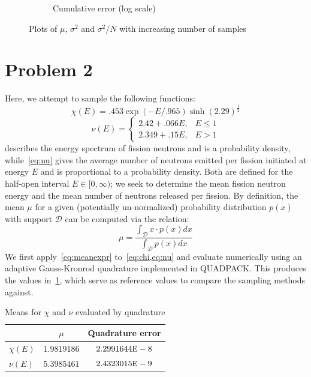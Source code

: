 \documentclass[12pt]{article}
\newcommand{\e}{\ensuremath{ \mbox{\small{E}} }}
\begin{document}
\begin{figure}[H]
\begin{subfigure}[b]{.49\textwidth}
        \caption{Cumulative error (log scale)}
        \label{fig:1:err}
    \end{subfigure}
    \caption{Plots of $\mu$, $\sigma^2$ and $\sigma^2 / N$ with increasing number of samples}
    \label{fig:1}
\end{figure}

\section*{Problem 2}

Here, we attempt to sample the following functions:
\begin{equation}
    \chi(E) = .453\exp(-E/.965)\sinh(2.29)^\frac{1}{2}
    \label{eq:chi}
\end{equation}
\begin{equation}
    \nu(E) = 
    \begin{cases}
        2.42 + .066E, & E\leq 1 \\
        2.349 + .15E, & E > 1
    \end{cases}
    \label{eq:nu}
\end{equation}
 describes the energy spectrum of fission neutrons and is a probability density, while~\cref{eq:nu}
gives the average number of neutrons emitted per fission initiated at energy $E$ and is proportional to a probability
density. Both are defined for the half-open interval $E\in [0,\infty)$; we seek to determine the mean fission
neutron energy and the mean number of neutrons released per fission. By definition, the mean $\mu$ for a given (potentially
un-normalized) probability distribution $p(x)$ with support $\mathcal{D}$ can be computed via the relation:
\begin{equation}
    \mu = \frac{\int_\mathcal{D} x \cdot p(x) dx}{\int_\mathcal{D} p(x) dx}
    \label{eq:meanexpr}
\end{equation}
We first apply~\cref{eq:meanexpr} to~\cref{eq:chi,eq:nu} and evaluate numerically using an adaptive Gauss-Kronrod
quadrature implemented in QUADPACK. This produces the values in~\cref{tab:quad}, which serve as reference values to compare
the sampling methods against.
\begin{table}[H]
    \centering
    \begin{tabular}{lcc}
        \toprule
          & $\mu$ & Quadrature error \\
        \midrule
        $\chi(E)$ & $1.9819186$ & $2.2991644\e-8$ \\
        $\nu(E)$ & $5.3985461$ & $2.4323015\e-9$ \\
        \bottomrule
    \end{tabular}
    \caption{Means for $\chi$ and $\nu$ evaluated by quadrature}
    \label{tab:quad}
\end{table}
\end{document}
